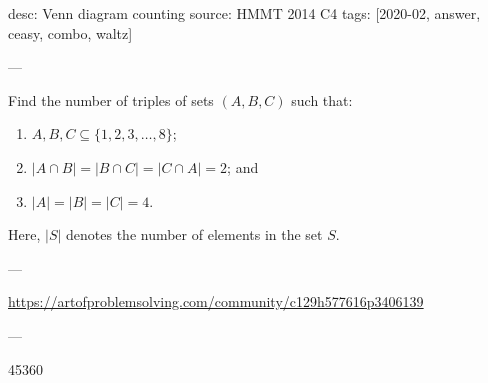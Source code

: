 desc: Venn diagram counting
source: HMMT 2014 C4
tags: [2020-02, answer, ceasy, combo, waltz]

---

Find the number of triples of sets $(A,B,C)$ such that:
\begin{enumerate}[label=(\roman*),itemsep=0em]
    \item $A,B,C\subseteq\{1,2,3,\ldots,8\}$;
    \item $|A\cap B|=|B\cap C|=|C\cap A|=2$; and
    \item $|A|=|B|=|C|=4$.
\end{enumerate}
Here, $|S|$ denotes the number of elements in the set $S$.

---

\url{https://artofproblemsolving.com/community/c129h577616p3406139}

---

45360
